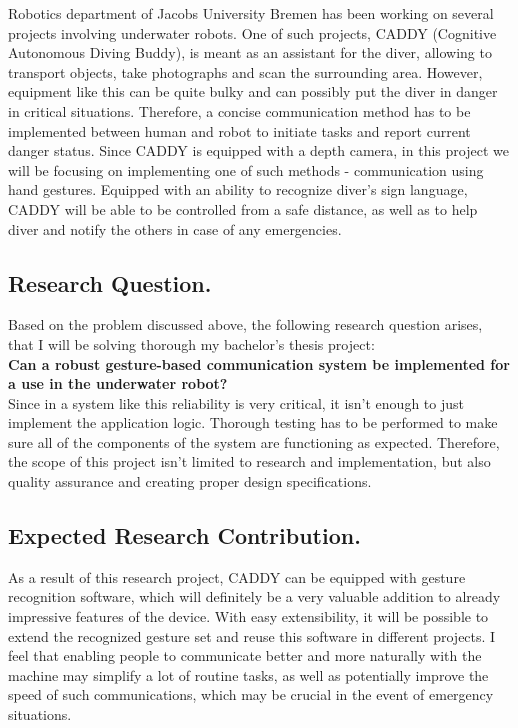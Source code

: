 \documentclass[a4paper,11pt,oneside]{article}
\begin{document}
  Robotics department of Jacobs University Bremen has been working on several projects involving underwater robots. One of such projects, CADDY (Cognitive Autonomous Diving Buddy), is meant as an assistant for the diver, allowing to transport objects, take photographs and scan the surrounding area. However, equipment like this can be quite bulky and can possibly put the diver in danger in critical situations. Therefore, a concise communication method has to be implemented between human and robot to initiate tasks and report current danger status. Since CADDY is equipped with a depth camera, in this project we will be focusing on implementing one of such methods - communication using hand gestures. Equipped with an ability to recognize diver's sign language, CADDY will be able to be controlled from a safe distance, as well as to help diver and notify the others in case of any emergencies.
  
  \subsection{Research Question.}
  
  Based on the problem discussed above, the following research question arises, that I will be solving thorough my bachelor's thesis project:\\
  \textbf{Can a robust gesture-based communication system be implemented for a use in the underwater robot?}\\
  Since in a system like this reliability is very critical, it isn't enough to just implement the application logic. Thorough testing has to be performed to make sure all of the components of the system are functioning as expected. Therefore, the scope of this project isn't limited to research and implementation, but also quality assurance and creating proper design specifications.
  
  \subsection{Expected Research Contribution.}
  
  As a result of this research project, CADDY can be equipped with gesture recognition software, which will definitely be a very valuable addition to already impressive features of the device. With easy extensibility, it will be possible to extend the recognized gesture set and reuse this software in different projects. I feel that enabling people to communicate better and more naturally with the machine may simplify a lot of routine tasks, as well as potentially improve the speed of such communications, which may be crucial in the event of emergency situations.
  
\end{document}
